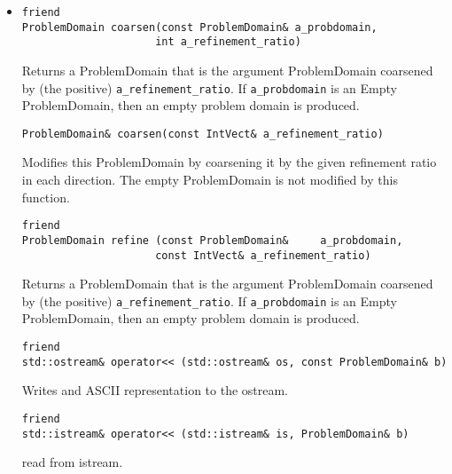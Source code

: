 \begin{itemize}
\item
\begin{verbatim}
friend
ProblemDomain coarsen(const ProblemDomain& a_probdomain,
                     int a_refinement_ratio)
\end{verbatim}
Returns a ProblemDomain that is the argument ProblemDomain coarsened by
(the positive) {\tt a\_refinement\_ratio}.  If {\tt a\_probdomain} is
an Empty ProblemDomain, then an empty problem domain is produced.

\begin{verbatim}
ProblemDomain& coarsen(const IntVect& a_refinement_ratio)
\end{verbatim} 
Modifies this ProblemDomain by coarsening it by the given refinement
ratio in each direction.  The empty ProblemDomain is not modified by
this function.

\begin{verbatim}
friend 
ProblemDomain refine (const ProblemDomain&     a_probdomain,
                     const IntVect& a_refinement_ratio)
\end{verbatim}
Returns a ProblemDomain that is the argument ProblemDomain coarsened by
(the positive) {\tt a\_refinement\_ratio}.  If {\tt a\_probdomain} is
an Empty ProblemDomain, then an empty problem domain is produced.



\begin{verbatim}
friend
std::ostream& operator<< (std::ostream& os, const ProblemDomain& b)
\end{verbatim}
Writes and ASCII representation to the ostream.

\begin{verbatim}
friend
std::istream& operator<< (std::istream& is, ProblemDomain& b)
\end{verbatim}
read from istream.



\end{itemize}


